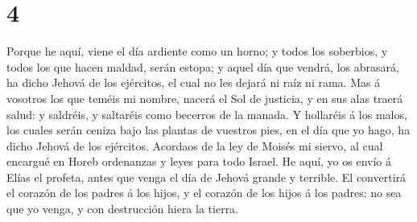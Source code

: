 \hypertarget{section-3}{%
\section{4}\label{section-3}}

 Porque he aquí, viene el día ardiente como un horno; y
todos los soberbios, y todos los que hacen maldad, serán estopa; y aquel
día que vendrá, los abrasará, ha dicho Jehová de los ejércitos, el cual
no les dejará ni raíz ni rama.  Mas á vosotros los que
teméis mi nombre, nacerá el Sol de justicia, y en sus alas traerá salud:
y saldréis, y saltaréis como becerros de la manada.  Y
hollaréis á los malos, los cuales serán ceniza bajo las plantas de
vuestros pies, en el día que yo hago, ha dicho Jehová de los ejércitos.
 Acordaos de la ley de Moisés mi siervo, al cual encargué
en Horeb ordenanzas y leyes para todo Israel.  He aquí, yo
os envío á Elías el profeta, antes que venga el día de Jehová grande y
terrible.  El convertirá el corazón de los padres á los
hijos, y el corazón de los hijos á los padres: no sea que yo venga, y
con destrucción hiera la tierra.
